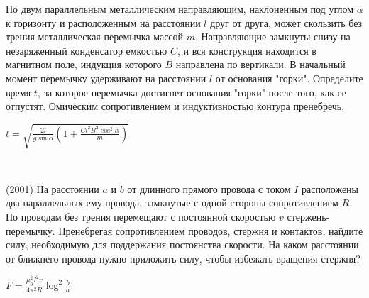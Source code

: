 \begin{ex}
По двум параллельным металлическим направляющим, наклоненным под углом $\alpha$ к горизонту и 
расположенным на расстоянии $l$ друг от друга, может скользить без трения металлическая перемычка массой $m$. 
Направляющие замкнуты снизу на незаряженный конденсатор емкостью $C$, и вся конструкция находится в магнитном поле, индукция которого $B$ направлена по вертикали. В начальный момент перемычку удерживают на расстоянии $l$ от основания "горки". 
Определите время $t$, за которое перемычка достигнет основания "горки"  после того, как ее отпустят. 
Омическим сопротивлением и индуктивностью контура пренебречь.
\begin{center}

\end{center}
\begin{ans}
$t=\sqrt{\frac{2l}{g \sin \alpha} \left( 1 + \frac{C l^2B^2 \cos^2 \alpha}{m} \right)}$
\end{ans}
\end{ex}

\begin{samepage}
\begin{ex}
\hspace{0pt} \\
\begin{minipage}{.65\textwidth}
(2001) На расстоянии $a$ и $b$ от длинного прямого провода с током $I$ расположены два параллельных ему провода, 
замкнутые с одной стороны сопротивлением $R$. По проводам без трения перемещают с постоянной скоростью $v$ стержень-перемычку. 
Пренебрегая сопротивлением проводов, стержня и контактов, найдите силу, необходимую для поддержания постоянства скорости. 
На каком расстоянии от ближнего провода нужно приложить силу, чтобы избежать вращения стержня?
\end{minipage}
\begin{minipage}{.35\textwidth}
\centering

\end{minipage}
\begin{ans}
$F=\frac{\mu_0^2 I^2 v}{4 \pi^2 R} \log^2 \frac{b}{a}$
\end{ans}
\end{ex}
\end{samepage}

